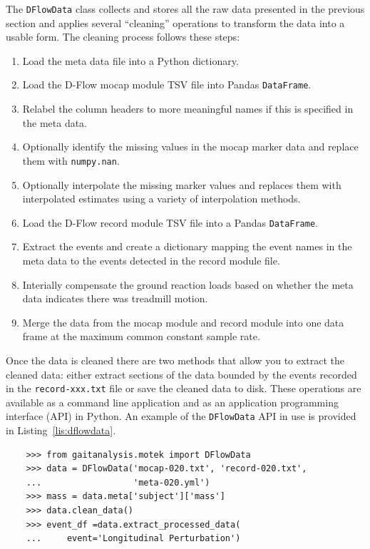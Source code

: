 \documentclass[fleqn,12pt]{wlpeerj}
\begin{document}
The \verb|DFlowData| class collects and stores all the raw data presented in
the previous section and applies several ``cleaning'' operations to transform
the data into a usable form. The cleaning process follows these steps:
%
\begin{enumerate}
  \item Load the meta data file into a Python dictionary.
  \item Load the D-Flow mocap module TSV file into Pandas \verb|DataFrame|.
  \item Relabel the column headers to more meaningful names if this is
    specified in the meta data.
  \item Optionally identify the missing values in the mocap marker data and
    replace them with \verb|numpy.nan|.
  \item Optionally interpolate the missing marker values and replaces them
    with interpolated estimates using a variety of interpolation methods.
  \item Load the D-Flow record module TSV file into a Pandas \verb|DataFrame|.
  \item Extract the events and create a dictionary mapping the event names in
    the meta data to the events detected in the record module file.
  \item Interially compensate the ground reaction loads based on whether the
    meta data indicates there was treadmill motion.
  \item Merge the data from the mocap module and record module into one data
    frame at the maximum common constant sample rate.
\end{enumerate}

Once the data is cleaned there are two methods that allow you to extract the
cleaned data: either extract sections of the data bounded by the events
recorded in the \verb|record-xxx.txt| file or save the cleaned data to disk.
These operations are available as a command line application and as an
application programming interface (API) in Python. An example of the
\verb|DFlowData| API in use is provided in Listing~\ref{lis:dflowdata}.
%
\begin{listing}
  \begin{verbatim}
    >>> from gaitanalysis.motek import DFlowData
    >>> data = DFlowData('mocap-020.txt', 'record-020.txt',
    ...                  'meta-020.yml')
    >>> mass = data.meta['subject']['mass']
    >>> data.clean_data()
    >>> event_df =data.extract_processed_data(
    ...     event='Longitudinal Perturbation')
  \end{verbatim}
  \cprotect\caption{Python interpreter session showing how one could load a
    trial into memory, extract the subject's mass from the meta data, run the
    data cleaning process, and finally extract a Pandas \verb|DataFrame|
    containing all of the time histories for a specific event in the trial.}
  \label{lis:dflowdata}
\end{listing}
\end{document}
